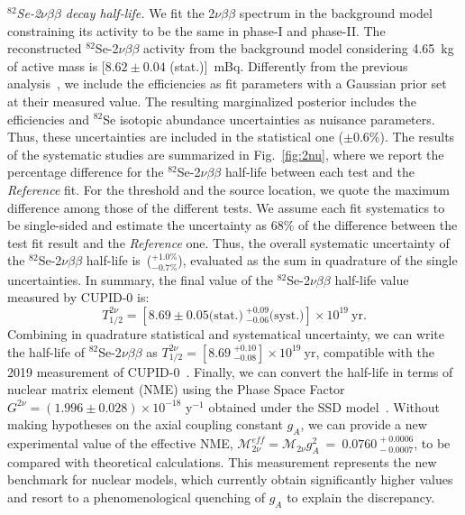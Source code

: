 \documentclass[%
reprint,
superscriptaddress,
altaffilletter,
showpacs,
showkeys,
amsmath, amssymb, aps,prl, floatfix
]{revtex4-1}
\newcommand{\SeMass}{4.65~kg\xspace}
\newcommand{\mvveffred}{0.0760~^{+~0.0006}_{-~0.0007}}
\newcommand{\HalfLifenewred}{T_{1/2}^{2\nu} = [8.69 \pm 0.05 \textrm{(stat.)}~^{+0.09}_{-0.06} \textrm{(syst.)}] \times 10^{19}~\textrm{yr}}
\newcommand{\HalfLifenewtotalred}{T_{1/2}^{2\nu} = [8.69~^{+0.10}_{-0.08}] \times 10^{19}~\textrm{yr}}
\newcommand{\HalfLifeoldtotal}{T_{1/2}^{2\nu} = [8.60~^{+0.19}_{-0.13}] \times 10^{19}~\textrm{yr}}
\newcommand{\vvactivitySSD}{[$8.62 \pm 0.04$ (stat.)]~mBq}
\newcommand{\se}{$^{82}$Se\xspace}
\newcommand{\vv}{2$\nu\beta\beta$\xspace}
\newcommand{\phone}{phase-I\xspace}
\newcommand{\phtwo}{phase-II\xspace}
\begin{document}
{\it \se-\vv decay half-life.} %
We fit the \vv spectrum in the background model constraining its activity to be the same in \phone and \phtwo. The reconstructed \se-\vv activity from the background model considering \SeMass of active mass is \vvactivitySSD.
Differently from the previous analysis~\cite{Azzolini:2019yib}, we include the efficiencies as fit parameters with a Gaussian prior set at their measured value. The resulting marginalized posterior includes the efficiencies and \se isotopic abundance uncertainties as nuisance parameters. Thus, these uncertainties are included in the statistical one ($\pm 0.6 \%$).
The results of the systematic studies are summarized in Fig.~\ref{fig:2nu}, where we report the percentage difference for the \se-\vv half-life between each test and the \textit{Reference} fit. 
For the threshold and the source location, we quote the maximum difference among those of the different tests.
We assume each fit systematics to be single-sided and estimate the uncertainty as 68\% of the difference between the test fit result and the {\it Reference} one. Thus, the overall systematic uncertainty of the \se-\vv half-life is~($^{+1.0\%}_{-0.7\%}$), evaluated as the sum in quadrature of the single uncertainties. In summary, the final value of the \se-\vv half-life value measured by CUPID-0 is:
\begin{equation*}
\HalfLifenewred.
\end{equation*}
Combining in quadrature statistical and systematical uncertainty, we can write the half-life of \se-\vv as $\HalfLifenewtotalred$, compatible with the 2019 measurement of CUPID-0~\cite{Azzolini:2019yib}.%
Finally, we can convert the half-life in terms of nuclear matrix element (NME) using the Phase Space Factor $G^{2\nu} = (1.996 \pm 0.028)\times10^{-18}$ y$^{-1}$ obtained under the SSD model~\cite{Kotila:2012zza,JKprivate}. Without making hypotheses on the axial coupling constant $g_A$, we can provide a new experimental value of the effective NME, $\mathcal{M}^{eff}_{2\nu}=\mathcal{M}_{2\nu}g_A^2$~=~$\mvveffred$, to be compared with theoretical calculations. This measurement represents the new benchmark for nuclear models, which currently obtain significantly higher values \cite{Nomura:2022nwv,Barea:2015kwa,Popara:2021lst,Coraggio:2018tuo,Ejiri:2019ezh} and resort to a phenomenological quenching of $g_A$ to explain the discrepancy.
\end{document}

